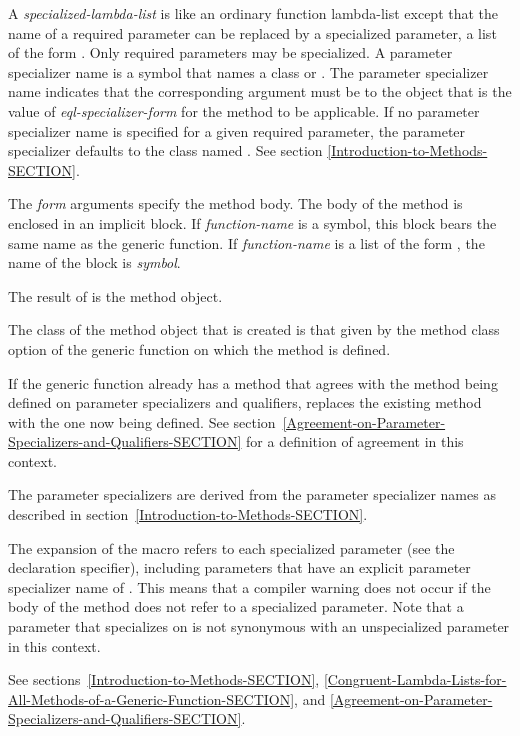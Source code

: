 \begin{defmac}
A {\it specialized-lambda-list\/} is like an ordinary
function lambda-list except that the name of a required parameter can
be replaced by a specialized parameter, a
list of the form .  Only required parameters may be
specialized.  A parameter specializer name is a symbol that names a
class or .  The parameter
specializer name  indicates
that the corresponding argument must be  to the object that
is the value of {\it eql-specializer-form\/} for the method to be
applicable.  If no parameter specializer name is specified for a given
required parameter, the parameter specializer defaults to the class
named .  See section \ref{Introduction-to-Methods-SECTION}.

The {\it form\/} arguments specify the method body.
The body of the method is enclosed in an implicit block.  If
{\it function-name\/} is a symbol, this block bears the same name as the
generic function.  If {\it function-name\/} is a list of the form 
, the name of the block is {\it symbol}.  


The result of  is the method object.


The class of the method object that is created is that given by the 
method class option of the generic function on which the method is defined.

If the generic function already has a method that agrees with the
method being defined on parameter specializers and qualifiers, 
 replaces the existing method with the one now being
defined.  See
section~\ref{Agreement-on-Parameter-Specializers-and-Qualifiers-SECTION}
for a definition of agreement in this context.

The parameter specializers are derived from the parameter specializer
names as described in section~\ref{Introduction-to-Methods-SECTION}.

The expansion of the  macro refers to each
specialized parameter (see the  declaration specifier), including
parameters that
have an explicit parameter specializer name of .  This means
that a compiler warning does not occur if the body of the method does
not refer to a specialized parameter.  Note that a parameter that
specializes on  is not synonymous with an unspecialized
parameter in this context.

See sections~\ref{Introduction-to-Methods-SECTION},
\ref{Congruent-Lambda-Lists-for-All-Methods-of-a-Generic-Function-SECTION},
and \ref{Agreement-on-Parameter-Specializers-and-Qualifiers-SECTION}.
\end{defmac}


